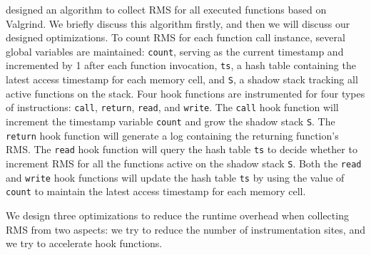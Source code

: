 \citet{Aprof1,Aprof2} designed an algorithm to collect 
RMS for all executed functions based on 
Valgrind. We briefly discuss this algorithm firstly, 
and then we will discuss our designed optimizations. 
To count RMS for each function call instance, 
several global variables are maintained: 
\texttt{count}, serving as the current timestamp and incremented 
by 1 after each function invocation,  
\texttt{ts}, a hash table containing the latest access timestamp for each memory cell, 
and \texttt{S}, a shadow stack tracking all active functions on the stack. 
Four hook functions are instrumented for four types of instructions:
\texttt{call}, \texttt{return}, \texttt{read}, and \texttt{write}.
The \texttt{call} hook function will increment the timestamp variable \texttt{count} 
and grow the shadow stack \texttt{S}.
The \texttt{return} hook function will generate a log containing the returning function's RMS.
The \texttt{read} hook function will query the hash table \texttt{ts} to decide whether 
to increment RMS for all the functions active on the shadow stack \texttt{S}.
Both the \texttt{read} and \texttt{write} hook functions will update the hash table \texttt{ts}
by using the value of \texttt{count} to maintain 
the latest access timestamp for each memory cell. 

We design three optimizations to reduce the runtime overhead when collecting RMS
from two aspects:
we try to reduce the number of instrumentation sites, 
and we try to accelerate hook functions. 

